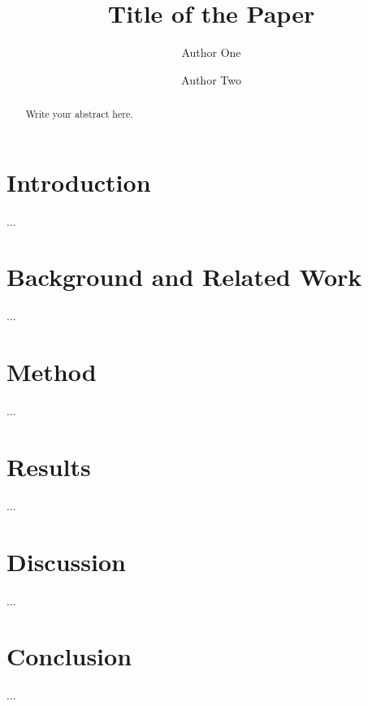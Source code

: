 \documentclass[runningheads]{llncs}
\title{Title of the Paper}
\author{Author One \and Author Two}
\institute{Institute/University, City, Country\\
\email{email@domain.com}}
\begin{document}
\maketitle

\begin{abstract}
Write your abstract here.
\end{abstract}

\section{Introduction}
...

\section{Background and Related Work}
...

\section{Method}
...

\section{Results}
...

\section{Discussion}
...

\section{Conclusion}
...
\end{document}

